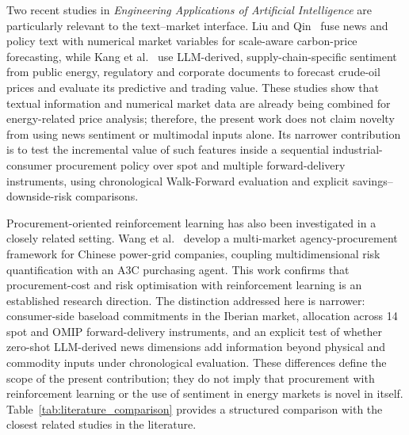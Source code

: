 Two recent studies in \textit{Engineering Applications of Artificial Intelligence} are particularly relevant to the text--market interface. Liu and Qin~\cite{liu2026scaleaware} fuse news and policy text with numerical market variables for scale-aware carbon-price forecasting, while Kang et al.~\cite{kang2026structuredsentiment} use LLM-derived, supply-chain-specific sentiment from public energy, regulatory and corporate documents to forecast crude-oil prices and evaluate its predictive and trading value. These studies show that textual information and numerical market data are already being combined for energy-related price analysis; therefore, the present work does not claim novelty from using news sentiment or multimodal inputs alone. Its narrower contribution is to test the incremental value of such features inside a sequential industrial-consumer procurement policy over spot and multiple forward-delivery instruments, using chronological Walk-Forward evaluation and explicit savings--downside-risk comparisons.

Procurement-oriented reinforcement learning has also been investigated in a closely related setting. Wang et al.~\cite{wang2026procurement} develop a multi-market agency-procurement framework for Chinese power-grid companies, coupling multidimensional risk quantification with an A3C purchasing agent. This work confirms that procurement-cost and risk optimisation with reinforcement learning is an established research direction. The distinction addressed here is narrower: consumer-side baseload commitments in the Iberian market, allocation across 14 spot and OMIP forward-delivery instruments, and an explicit test of whether zero-shot LLM-derived news dimensions add information beyond physical and commodity inputs under chronological evaluation. These differences define the scope of the present contribution; they do not imply that procurement with reinforcement learning or the use of sentiment in energy markets is novel in itself. Table~\ref{tab:literature_comparison} provides a structured comparison with the closest related studies in the literature.

